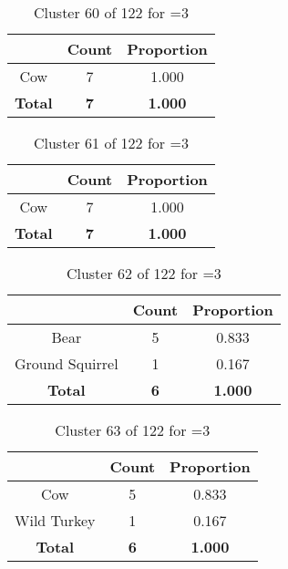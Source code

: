 \clearpage
\begin{table}[ht!]
\centering
\begin{tabular}{|c|c|c|}
\hline
\bf \Spec{} &\bf Count &\bf Proportion\\ \hline \hline
Cow & 7 & 1.000\\ \hline
\hline
\bf Total & \bf 7 & \bf 1.000\\ \hline
\end{tabular}
\label{tab:cluster:60:3}
\caption{Cluster 60 of 122 for \minneigh{}=3}
\end{table}

\begin{table}[ht!]
\centering
\begin{tabular}{|c|c|c|}
\hline
\bf \Spec{} &\bf Count &\bf Proportion\\ \hline \hline
Cow & 7 & 1.000\\ \hline
\hline
\bf Total & \bf 7 & \bf 1.000\\ \hline
\end{tabular}
\label{tab:cluster:61:3}
\caption{Cluster 61 of 122 for \minneigh{}=3}
\end{table}

\begin{table}[ht!]
\centering
\begin{tabular}{|c|c|c|}
\hline
\bf \Spec{} &\bf Count &\bf Proportion\\ \hline \hline
Bear & 5 & 0.833\\ \hline
Ground Squirrel & 1 & 0.167\\ \hline
\hline
\bf Total & \bf 6 & \bf 1.000\\ \hline
\end{tabular}
\label{tab:cluster:62:3}
\caption{Cluster 62 of 122 for \minneigh{}=3}
\end{table}

\begin{table}[ht!]
\centering
\begin{tabular}{|c|c|c|}
\hline
\bf \Spec{} &\bf Count &\bf Proportion\\ \hline \hline
Cow & 5 & 0.833\\ \hline
Wild Turkey & 1 & 0.167\\ \hline
\hline
\bf Total & \bf 6 & \bf 1.000\\ \hline
\end{tabular}
\label{tab:cluster:63:3}
\caption{Cluster 63 of 122 for \minneigh{}=3}
\end{table}

